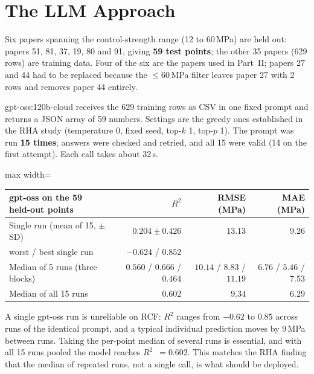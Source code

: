 \documentclass[11pt]{article}
\newcommand{\R}{$R^2$}
\begin{document}
\section{The LLM Approach}
\label{sec:rcf-p3-llm}
Six papers spanning the control-strength range (12 to 60\,MPa) are held out: papers 51,
81, 37, 19, 80 and 91, giving \textbf{59 test points}; the other 35 papers (629 rows) are
training data. Four of the six are the papers used in Part~II; papers 27 and 44 had to be
replaced because the $\leq60$\,MPa filter leaves paper 27 with 2 rows and removes paper 44
entirely.

gpt-oss:120b-cloud receives the 629 training rows as CSV in one fixed prompt and returns a
JSON array of 59 numbers. Settings are the greedy ones established in the RHA study
(temperature 0, fixed seed, top-$k$ 1, top-$p$ 1). The prompt was run \textbf{15 times};
answers were checked and retried, and all 15 were valid (14 on the first attempt). Each
call takes about 32\,s.

\begin{center}\small
\begin{adjustbox}{max width=\linewidth}
\begin{tabular}{lrrr}
\toprule
gpt-oss on the 59 held-out points & \R{} & RMSE (MPa) & MAE (MPa) \\
\midrule
Single run (mean of 15, $\pm$ SD) & $0.204\pm0.426$ & $13.13$ & $9.26$ \\
\quad worst / best single run & $-0.624$ / $0.852$ & & \\
Median of 5 runs (three blocks) & $0.560$ / $0.666$ / $0.464$ & $10.14$ / $8.83$ / $11.19$ & $6.76$ / $5.46$ / $7.53$ \\
\rowcolor{green!12}Median of all 15 runs & $\mathbf{0.602}$ & $\mathbf{9.34}$ & $\mathbf{6.29}$ \\
\bottomrule
\end{tabular}
\end{adjustbox}
\end{center}

\noindent A single gpt-oss run is unreliable on RCF: \R{} ranges from $-0.62$ to $0.85$
across runs of the identical prompt, and a typical individual prediction moves by 9\,MPa
between runs. Taking the per-point median of several runs is essential, and with all 15
runs pooled the model reaches \R{}~$=0.602$. This matches the RHA finding that the median
of repeated runs, not a single call, is what should be deployed.
\end{document}
